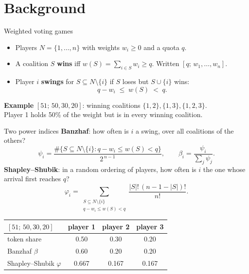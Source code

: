 \documentclass[aspectratio=169,11pt]{beamer}
\begin{document}
\section{Background}
\begin{frame}{Weighted voting games}
  \begin{itemize}
    \item Players $N=\{1,\dots,n\}$ with weights $w_i \ge 0$ and a quota $q$.
    \item A coalition $S$ \textbf{wins} iff $w(S)=\sum_{i\in S} w_i \ge q$. Written $[q;\,w_1,\dots,w_n]$.
    \item Player $i$ \textbf{swings} for $S \subseteq N\setminus\{i\}$ if $S$ loses but $S\cup\{i\}$ wins:
      \[ q - w_i \;\le\; w(S) \;<\; q. \]
  \end{itemize}
  \vspace{0.5em}
  \textbf{Example} $[51;\,50,30,20]$: winning coalitions $\{1,2\},\{1,3\},\{1,2,3\}$.\\
  Player 1 holds 50\% of the weight but is in every winning coalition.
\end{frame}

\begin{frame}{Two power indices}
  \small
  \textbf{Banzhaf}: how often is $i$ a swing, over all coalitions of the others?
  \[ \psi_i = \frac{\#\{S \subseteq N\setminus\{i\} : q-w_i \le w(S) < q\}}{2^{\,n-1}}, \qquad \beta_i = \frac{\psi_i}{\sum_j \psi_j}. \]
  \textbf{Shapley--Shubik}: in a random ordering of players, how often is $i$ the one whose arrival first reaches $q$?
  \[ \varphi_i = \sum_{\substack{S \subseteq N\setminus\{i\}\\ q-w_i \le w(S) < q}} \frac{|S|!\,(n-1-|S|)!}{n!}. \]
  \begin{center}
  \begin{tabular}{lccc}
    \toprule
    $[51;\,50,30,20]$ & player 1 & player 2 & player 3\\ \midrule
    token share & 0.50 & 0.30 & 0.20\\
    Banzhaf $\beta$ & 0.60 & 0.20 & 0.20\\
    Shapley--Shubik $\varphi$ & 0.667 & 0.167 & 0.167\\ \bottomrule
  \end{tabular}
  \end{center}
  \vspace{-0.4em}
\end{frame}


\end{document}
